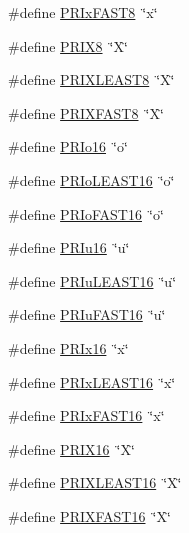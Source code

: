 \begin{DoxyCompactItemize}
\item 
\#define \hyperlink{group__avr__inttypes_gae7e1780719eb0e4b2826a0da06255780}{P\+R\+Ix\+F\+A\+S\+T8}~\char`\"{}x\char`\"{}
\item 
\#define \hyperlink{group__avr__inttypes_ga4e9b835c85ffa875e8304e2b852b4c86}{P\+R\+I\+X8}~\char`\"{}X\char`\"{}
\item 
\#define \hyperlink{group__avr__inttypes_ga70aa3faf72084587fb18d03aa033a212}{P\+R\+I\+X\+L\+E\+A\+S\+T8}~\char`\"{}X\char`\"{}
\item 
\#define \hyperlink{group__avr__inttypes_gab153efc9e6547ca56f42de767cde2595}{P\+R\+I\+X\+F\+A\+S\+T8}~\char`\"{}X\char`\"{}
\item 
\#define \hyperlink{group__avr__inttypes_ga55494a16151668ea78e0b808ef38c8c1}{P\+R\+Io16}~\char`\"{}o\char`\"{}
\item 
\#define \hyperlink{group__avr__inttypes_ga1ecbd31333b358c22423a541fffbd122}{P\+R\+Io\+L\+E\+A\+S\+T16}~\char`\"{}o\char`\"{}
\item 
\#define \hyperlink{group__avr__inttypes_ga3eda49c829de683e701eaed3cbaf0e73}{P\+R\+Io\+F\+A\+S\+T16}~\char`\"{}o\char`\"{}
\item 
\#define \hyperlink{group__avr__inttypes_ga86bc00ee87e8e40787e0681fc34c576a}{P\+R\+Iu16}~\char`\"{}u\char`\"{}
\item 
\#define \hyperlink{group__avr__inttypes_gaa3ba696eef7c107c76c26eea76dcb4b4}{P\+R\+Iu\+L\+E\+A\+S\+T16}~\char`\"{}u\char`\"{}
\item 
\#define \hyperlink{group__avr__inttypes_gaa82e218a186691ebf7149b36746c12e7}{P\+R\+Iu\+F\+A\+S\+T16}~\char`\"{}u\char`\"{}
\item 
\#define \hyperlink{group__avr__inttypes_ga70f5e38b517f714518c970a4da37bef1}{P\+R\+Ix16}~\char`\"{}x\char`\"{}
\item 
\#define \hyperlink{group__avr__inttypes_gad00e2a12b813425800cad731f61497ae}{P\+R\+Ix\+L\+E\+A\+S\+T16}~\char`\"{}x\char`\"{}
\item 
\#define \hyperlink{group__avr__inttypes_ga6f66e34285ab57a86aeb2f0f4895417d}{P\+R\+Ix\+F\+A\+S\+T16}~\char`\"{}x\char`\"{}
\item 
\#define \hyperlink{group__avr__inttypes_ga570ca9af5087023f75fc8a1a602d26ab}{P\+R\+I\+X16}~\char`\"{}X\char`\"{}
\item 
\#define \hyperlink{group__avr__inttypes_gafa4303b077ae4c6c58686178e4b90d18}{P\+R\+I\+X\+L\+E\+A\+S\+T16}~\char`\"{}X\char`\"{}
\item 
\#define \hyperlink{group__avr__inttypes_ga785eabe6337a2fa85874ae99300abb66}{P\+R\+I\+X\+F\+A\+S\+T16}~\char`\"{}X\char`\"{}

\end{DoxyCompactItemize}
